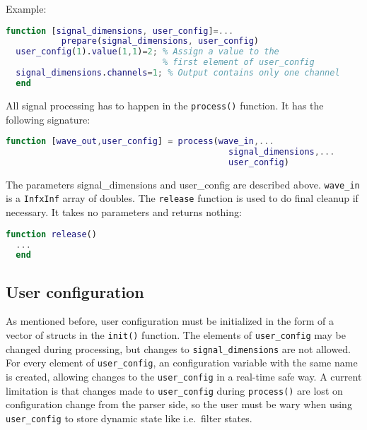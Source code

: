 \documentclass[11pt,a4paper,twoside]{article}
\newcommand{\+}{\discretionary{\mbox{\scriptsize$\hookleftarrow$}}{}{}}
\begin{document}
  Example:
\begin{lstlisting}[language=Matlab]
  function [signal_dimensions, user_config]=...
           prepare(signal_dimensions, user_config)
  user_config(1).value(1,1)=2; % Assign a value to the
                               % first element of user_config 
  signal_dimensions.channels=1; % Output contains only one channel
  end
\end{lstlisting}
All signal processing has to happen in the \texttt{process()} function. It has the following signature:
\begin{lstlisting}[language=Matlab]
  function [wave_out,user_config] = process(wave_in,...
                                            signal_dimensions,...
                                            user_config)
\end{lstlisting}
The parameters signal\_dimensions and user\_config are described above.
\texttt{wave\_in} is a \texttt{InfxInf} array of doubles.
The \texttt{release} function is used to do final cleanup if necessary.
It takes no parameters and returns nothing:
\begin{lstlisting}[language=Matlab]
  function release()
  ...
  end
\end{lstlisting}
\subsection{User configuration}
As mentioned before, user configuration must be initialized in the form of a
vector of structs in the \texttt{init()} function.
The elements of \texttt{user\_config} may be changed during processing,
but changes to \texttt{signal\_dimensions} are not allowed. 
For every element of \texttt{user\_config}, an \mha{} configuration variable
with the same name is created, allowing changes to the \texttt{user\_config} in
a real-time safe way.
A current limitation is that changes made to \texttt{user\_config} during \texttt{process()} are
lost on configuration change from the parser side, so the user must be wary when using \texttt{user\_config} to store
dynamic state like i.e.\ filter states.
\end{document}
